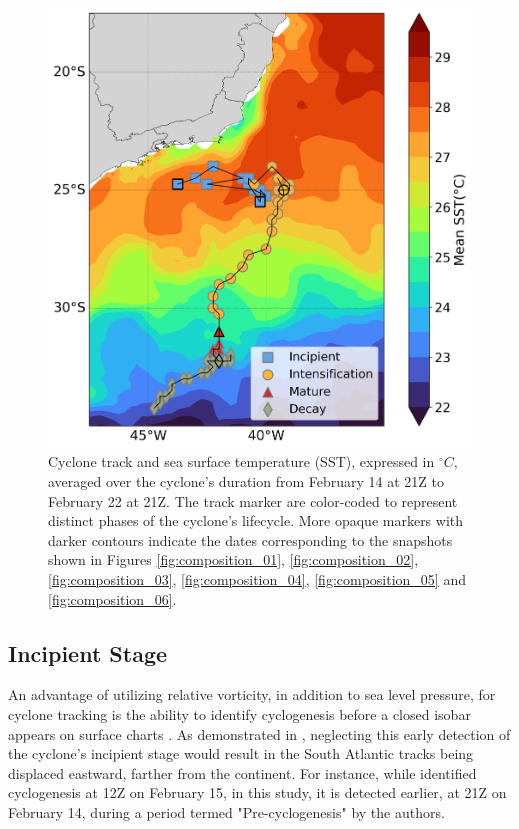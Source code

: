 \documentclass[pdflatex,sn-chicago]{sn-jnl}%
\theoremstyle{plain}
\theoremstyle{definition}
\theoremstyle{remark}
\theoremstyle{definition}
\begin{document}
\begin{figure}[h!]
\centering
\includegraphics[width=\textwidth]{Akara_mean_sst_track.png}
\caption{Cyclone track and sea surface temperature (SST), expressed in $^{\circ}C$, averaged over the cyclone's duration from February 14 at 21Z to February 22 at 21Z. The track marker are color-coded to represent distinct phases of the cyclone's lifecycle. More opaque markers with darker contours indicate the dates corresponding to the snapshots shown in Figures \ref{fig:composition_01}, \ref{fig:composition_02}, \ref{fig:composition_03}, \ref{fig:composition_04}, \ref{fig:composition_05} and \ref{fig:composition_06}.}
\label{fig:Akara_mean_sst_track}
\end{figure}

\subsection{Incipient Stage}\label{sec:incipient}

An advantage of utilizing relative vorticity, in addition to sea level pressure, for cyclone tracking is the ability to identify cyclogenesis before a closed isobar appears on surface charts \citep[e.g.,][]{sinclair1994objective,gramcianinov2019properties}. As demonstrated in \citet{couto2024new}, neglecting this early detection of the cyclone's incipient stage would result in the South Atlantic tracks being displaced eastward, farther from the continent. For instance, while \citet{reboita2024assessment} identified cyclogenesis at 12Z on February 15, in this study, it is detected earlier, at 21Z on February 14, during a period termed "Pre-cyclogenesis" by the authors.
\end{document}
